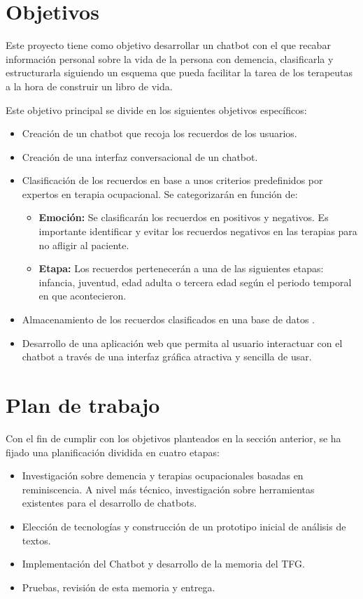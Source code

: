 \section{Objetivos}

Este proyecto tiene como objetivo desarrollar un chatbot con el que recabar información personal sobre la vida de la persona con demencia, clasificarla y estructurarla siguiendo un esquema que pueda facilitar la tarea de los terapeutas a la hora de construir un libro de vida. 

Este objetivo principal se divide en los siguientes objetivos específicos:
\begin{itemize}
	\item Creación de un chatbot que recoja los recuerdos de los usuarios.
	\item Creación de una interfaz conversacional de un chatbot.
	\item Clasificación de los recuerdos en base a unos criterios predefinidos por expertos en terapia ocupacional. Se categorizarán en función de: 
	\begin{itemize}
		\item \textbf{Emoción:} Se clasificarán los recuerdos en positivos y negativos. Es importante identificar y evitar los recuerdos negativos en las terapias para no afligir al paciente. 
		\item \textbf{Etapa:} Los recuerdos pertenecerán a una de las siguientes etapas: infancia, juventud, edad adulta o tercera edad según el periodo temporal en que acontecieron.
	\end{itemize}
	\item Almacenamiento de los recuerdos clasificados en una base de datos .
	\item Desarrollo de una aplicación web que permita al usuario interactuar con el chatbot a través de una interfaz gráfica atractiva y sencilla de usar.
\end{itemize}


\section{Plan de trabajo}

Con el fin de cumplir con los objetivos planteados en la sección anterior, se ha fijado una planificación dividida en cuatro etapas:
\begin{itemize}
	\item Investigación sobre demencia y terapias ocupacionales basadas en reminiscencia. A nivel más técnico, investigación sobre herramientas existentes para el desarrollo de chatbots.
	\item Elección de tecnologías y construcción de un prototipo inicial de análisis de textos.
	\item Implementación del Chatbot y desarrollo de la memoria del TFG.
	\item Pruebas, revisión de esta memoria y entrega.	
\end{itemize}

